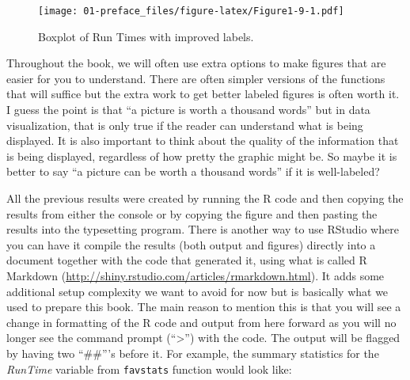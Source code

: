 \documentclass[]{book}
\newenvironment{Shaded}{\begin{snugshade}}{\end{snugshade}}
\newcommand{\DataTypeTok}[1]{\textcolor[rgb]{0.13,0.29,0.53}{#1}}
\newcommand{\KeywordTok}[1]{\textcolor[rgb]{0.13,0.29,0.53}{\textbf{#1}}}
\newcommand{\NormalTok}[1]{#1}
\newcommand{\OperatorTok}[1]{\textcolor[rgb]{0.81,0.36,0.00}{\textbf{#1}}}
\newcommand{\StringTok}[1]{\textcolor[rgb]{0.31,0.60,0.02}{#1}}
\renewcommand{\indent}{\hspace{15pt}}
\renewenvironment{Shaded}{%
\setlength{\FrameRule}{1.5pt}
\def\FrameCommand{\fboxrule=\FrameRule\fboxsep=5pt 
                  \fcolorbox{framecolor}{shadecolor}}%
\MakeFramed {\FrameRestore}}%
{\endMakeFramed}
\begin{document}
\begin{figure}
\centering
\texttt{[image: 01-preface\_files/figure-latex/Figure1-9-1.pdf]}
\caption{\label{fig:Figure1-9}Boxplot of Run Times with improved labels.}
\end{figure}

\begin{Shaded}
\end{Shaded}

\indent Throughout the book, we will often use extra options to make figures that
are easier for you to understand. There
are often simpler versions of the functions that will suffice but the extra
work to get better labeled figures is often worth it. I guess the point is that
``a picture is worth a thousand words'' but in data visualization, that is only
true if the reader can understand what is being displayed. It is also important
to think about the quality of the information that is being displayed,
regardless of how pretty the graphic might be. So maybe it is better to say
``a picture can be worth a thousand words'' if it is well-labeled?

\indent All the previous results were created by running the R code and then copying the
results from either the console or by copying the figure and then pasting the results
into the typesetting program. There is another way
to use RStudio where you can have it compile the results (both output and
figures) directly into a document together with the code that generated it,
using what is called R Markdown (\url{http://shiny.rstudio.com/articles/rmarkdown.html}).
It adds some additional setup
complexity we want to avoid for now but is basically what we used to prepare this book.
The main reason to mention this is that you will see a
change in formatting of the R code and output from here forward as you will no
longer see the command prompt (``\textgreater{}'') with the code. The output will be
flagged by having two ``\#\#'''s before it. For example, the summary statistics for
the \emph{RunTime} variable from \texttt{favstats} function would look like:

\begin{Shaded}
\end{Shaded}
\end{document}
